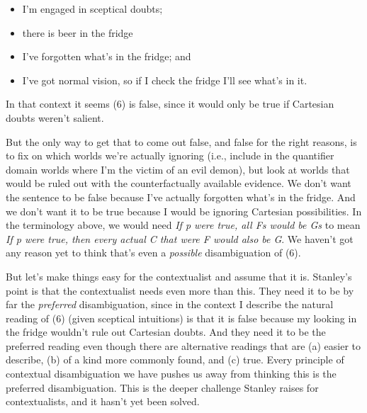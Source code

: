 \begin{itemize}
\item I'm engaged in sceptical doubts;
\item there is beer in the fridge
\item I've forgotten what's in the fridge; and
\item I've got normal vision, so if I check the fridge I'll see what's in it.
\end{itemize}

\noindent In that context it seems (6) is false, since it would only be true if Cartesian doubts weren't salient.


\noindent But the only way to get that to come out false, and false for the right reasons, is to fix on which worlds we're actually ignoring (i.e., include in the quantifier domain worlds where I'm the victim of an evil demon), but look at worlds that would be ruled out with the counterfactually available evidence. We don't want the sentence to be false because I've actually forgotten what's in the fridge. And we don't want it to be true because I would be ignoring Cartesian possibilities. In the terminology above, we would need \textit{If p were true, all Fs would be Gs} to mean \textit{If p were true, then every actual C that were F would also be G}. We haven't got any reason yet to think that's even a \textit{possible} disambiguation of (6). 

But let's make things easy for the contextualist and assume that it is. Stanley's point is that the contextualist needs even more than this. They need it to be by far the  \textit{preferred} disambiguation, since in the context I describe the natural reading of (6) (given sceptical intuitions) is that it is false because my looking in the fridge wouldn't rule out Cartesian doubts. And they need it to be the preferred reading even though there are alternative readings that are (a) easier to describe, (b) of a kind more commonly found, and (c) true. Every principle of contextual disambiguation we have pushes us away from thinking this is the preferred disambiguation. This is the deeper challenge Stanley raises for contextualists, and it hasn't yet been solved.

